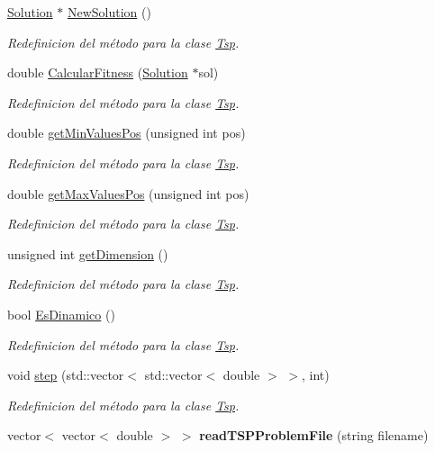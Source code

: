 \begin{DoxyCompactItemize}
\item 
\hyperlink{class_solution}{Solution} $\ast$ \hyperlink{class_tsp_ab37f446ab806d6f42e036a815a8eb0fb}{New\+Solution} ()
\begin{DoxyCompactList}\small\item\em Redefinicion del método para la clase \hyperlink{class_tsp}{Tsp}. \end{DoxyCompactList}\item 
double \hyperlink{class_tsp_a84ed21c114ae235e2c0f56177c164a0a}{Calcular\+Fitness} (\hyperlink{class_solution}{Solution} $\ast$sol)
\begin{DoxyCompactList}\small\item\em Redefinicion del método para la clase \hyperlink{class_tsp}{Tsp}. \end{DoxyCompactList}\item 
double \hyperlink{class_tsp_aae80b10d5d2b846a5f7d03fc44263ab2}{get\+Min\+Values\+Pos} (unsigned int pos)
\begin{DoxyCompactList}\small\item\em Redefinicion del método para la clase \hyperlink{class_tsp}{Tsp}. \end{DoxyCompactList}\item 
double \hyperlink{class_tsp_a5bdc7d7f407f9bc2084d77c971cb99ef}{get\+Max\+Values\+Pos} (unsigned int pos)
\begin{DoxyCompactList}\small\item\em Redefinicion del método para la clase \hyperlink{class_tsp}{Tsp}. \end{DoxyCompactList}\item 
unsigned int \hyperlink{class_tsp_a0f6463fc9e034a8c78bf4cac881df990}{get\+Dimension} ()
\begin{DoxyCompactList}\small\item\em Redefinicion del método para la clase \hyperlink{class_tsp}{Tsp}. \end{DoxyCompactList}\item 
bool \hyperlink{class_tsp_a9a77be6018464e5380296fa8decc36ac}{Es\+Dinamico} ()
\begin{DoxyCompactList}\small\item\em Redefinicion del método para la clase \hyperlink{class_tsp}{Tsp}. \end{DoxyCompactList}\item 
void \hyperlink{class_tsp_a15c1d7f52f3d6ce233d86beda80eabf4}{step} (std\+::vector$<$ std\+::vector$<$ double $>$ $>$, int)
\begin{DoxyCompactList}\small\item\em Redefinicion del método para la clase \hyperlink{class_tsp}{Tsp}. \end{DoxyCompactList}\item 
\hypertarget{class_tsp_a499348dd3e9939f2cf04603382735285}{vector$<$ vector$<$ double $>$ $>$ {\bfseries read\+T\+S\+P\+Problem\+File} (string filename)}\label{class_tsp_a499348dd3e9939f2cf04603382735285}

\end{DoxyCompactItemize}

